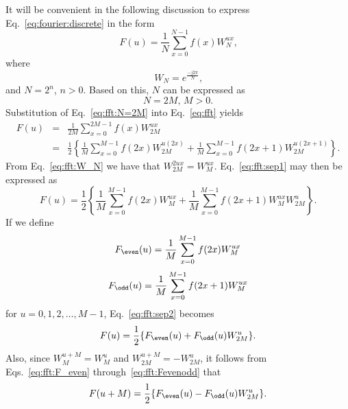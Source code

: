 It will be convenient in the following discussion to express
Eq.~\ref{eq:fourier:discrete} in the form
\begin{equation}
\label{eq:fft}
  F(u)=\frac{1}{N}\sum_{x=0}^{N-1}f(x)W_{N}^{ux}\mbox{,}
\end{equation}
where
\begin{equation}
\label{eq:fft:W_N}
  W_{N}=e^{\frac{-j2\pi}{N}}\mbox{,}
\end{equation}
and $N=2^{n}$, $n>0$.  Based on this, $N$ can be expressed as
\begin{equation}
\label{eq:fft:N=2M}
  N=2M\mbox{, $M>0$.}
\end{equation}
Substitution of Eq.~\ref{eq:fft:N=2M} into Eq.~\ref{eq:fft}
yields 
\begin{eqnarray}
\label{eq:fft:sep1}
  F(u) & = & \frac{1}{2M}\sum_{x=0}^{2M-1}f(x)W_{2M}^{ux}\nonumber\\
       & = & \frac{1}{2}\left\{\frac{1}{M}\sum_{x=0}^{M-1}
             f(2x)W_{2M}^{u(2x)}+
             \frac{1}{M}\sum_{x=0}^{M-1}
             f(2x+1)W_{2M}^{u(2x+1)}\right\}\mbox{.}
\end{eqnarray}
From Eq.~\ref{eq:fft:W_N} we have that $W_{2M}^{2ux}=W_{M}^{ux}$.
Eq.~\ref{eq:fft:sep1} may then be expressed as
\begin{equation}
\label{eq:fft:sep2}
  F(u)=\frac{1}{2}\left\{\frac{1}{M}\sum_{x=0}^{M-1}f(2x)W_{M}^{ux}+
  \frac{1}{M}\sum_{x=0}^{M-1}f(2x+1)W_{M}^{ux}W_{2M}^{u}\right\}\mbox{.}
\end{equation}
If we define
\begin{equation}
\label{eq:fft:F_even}
  F_{\even}(u)=\frac{1}{M}\sum_{x=0}^{M-1}f(2x)W_{M}^{ux}
\end{equation}
\begin{equation}
\label{eq:fft:F_odd}
  F_{\odd}(u)=\frac{1}{M}\sum_{x=0}^{M-1}f(2x+1)W_{M}^{ux}
\end{equation}
for $u=0,1,2,\ldots,M-1$, Eq.~\ref{eq:fft:sep2} becomes
\begin{equation}
\label{eq:fft:Fevenodd}
  F(u)=\frac{1}{2}\{F_{\even}(u)+F_{\odd}(u)W_{2M}^{u}\}\mbox{.}
\end{equation}
Also, since $W_{M}^{u+M}=W_{M}^{u}$ and $W_{2M}^{u+M}=-W_{2M}^{u}$, it
follows from Eqs.~\ref{eq:fft:F_even} through~\ref{eq:fft:Fevenodd}
that
\begin{equation}
\label{eq:fft:doubling}
  F(u+M)=\frac{1}{2}\{F_{\even}(u)-F_{\odd}(u)W_{2M}^{u}\}\mbox{.}
\end{equation}

